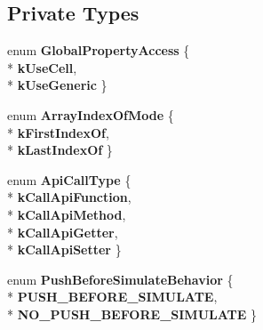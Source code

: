 \subsection*{Private Types}
\begin{DoxyCompactItemize}
\item 
enum {\bfseries Global\+Property\+Access} \{ \\*
{\bfseries k\+Use\+Cell}, 
\\*
{\bfseries k\+Use\+Generic}
 \}\hypertarget{classv8_1_1internal_1_1_h_optimized_graph_builder_ab247b76e171cff3fa5e5daa25cc1785a}{}\label{classv8_1_1internal_1_1_h_optimized_graph_builder_ab247b76e171cff3fa5e5daa25cc1785a}

\item 
enum {\bfseries Array\+Index\+Of\+Mode} \{ \\*
{\bfseries k\+First\+Index\+Of}, 
\\*
{\bfseries k\+Last\+Index\+Of}
 \}\hypertarget{classv8_1_1internal_1_1_h_optimized_graph_builder_a12c48ffc6799827460bc499434a6f69e}{}\label{classv8_1_1internal_1_1_h_optimized_graph_builder_a12c48ffc6799827460bc499434a6f69e}

\item 
enum {\bfseries Api\+Call\+Type} \{ \\*
{\bfseries k\+Call\+Api\+Function}, 
\\*
{\bfseries k\+Call\+Api\+Method}, 
\\*
{\bfseries k\+Call\+Api\+Getter}, 
\\*
{\bfseries k\+Call\+Api\+Setter}
 \}\hypertarget{classv8_1_1internal_1_1_h_optimized_graph_builder_a7761c60558a786a5689d792e117ed5d9}{}\label{classv8_1_1internal_1_1_h_optimized_graph_builder_a7761c60558a786a5689d792e117ed5d9}

\item 
enum {\bfseries Push\+Before\+Simulate\+Behavior} \{ \\*
{\bfseries P\+U\+S\+H\+\_\+\+B\+E\+F\+O\+R\+E\+\_\+\+S\+I\+M\+U\+L\+A\+TE}, 
\\*
{\bfseries N\+O\+\_\+\+P\+U\+S\+H\+\_\+\+B\+E\+F\+O\+R\+E\+\_\+\+S\+I\+M\+U\+L\+A\+TE}
 \}\hypertarget{classv8_1_1internal_1_1_h_optimized_graph_builder_a05ef584934ca5b911322c62c396514cc}{}\label{classv8_1_1internal_1_1_h_optimized_graph_builder_a05ef584934ca5b911322c62c396514cc}

\end{DoxyCompactItemize}
